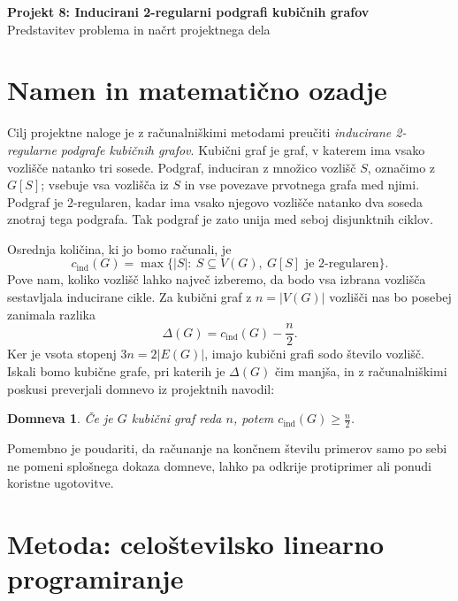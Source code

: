 \documentclass[11pt,a4paper]{article}
\newtheorem{proposition}{Domneva}
\begin{document}
\begin{center}
    {\LARGE\bfseries Projekt 8: Inducirani 2-regularni podgrafi kubičnih grafov}\\[5pt]
    {\large Predstavitev problema in načrt projektnega dela}
\end{center}
\vspace{3pt}

\section{Namen in matematično ozadje}

Cilj projektne naloge je z računalniškimi metodami preučiti \emph{inducirane 2-regularne podgrafe kubičnih grafov}. Kubični graf
je graf, v katerem ima vsako vozlišče natanko tri sosede. Podgraf, induciran z množico vozlišč
$S$, označimo z $G[S]$; vsebuje vsa vozlišča iz $S$ in vse povezave prvotnega grafa med
njimi. Podgraf je 2-regularen, kadar ima vsako njegovo vozlišče natanko dva soseda znotraj tega podgrafa.
Tak podgraf je zato unija med seboj disjunktnih ciklov.

Osrednja količina, ki jo bomo računali, je
\begin{equation}
    c_{\mathrm{ind}}(G)
    =\max\bigl\{|S|:\ S\subseteq V(G),\ G[S]\text{ je 2-regularen}\bigr\}.
\end{equation}
Pove nam, koliko vozlišč lahko največ izberemo, da bodo vsa izbrana vozlišča sestavljala inducirane cikle.
Za kubični graf z $n=|V(G)|$ vozlišči nas bo posebej zanimala razlika
\[
    \Delta(G)=c_{\mathrm{ind}}(G)-\frac{n}{2}.
\]
Ker je vsota stopenj $3n=2|E(G)|$, imajo kubični grafi sodo število vozlišč. Iskali bomo kubične grafe,
pri katerih je $\Delta(G)$ čim manjša, in z računalniškimi poskusi preverjali domnevo iz projektnih
navodil: 

\begin{proposition}
    \label{domneva}
    Če je $G$ kubični graf reda $n$, potem $c_{\mathrm{ind}}(G) \geq \frac{n}{2}$.
\end{proposition}

Pomembno je poudariti, da računanje na končnem številu primerov samo po sebi ne pomeni
splošnega dokaza domneve, lahko pa odkrije protiprimer ali ponudi koristne ugotovitve.

\section{Metoda: celoštevilsko linearno programiranje}
\end{document}
